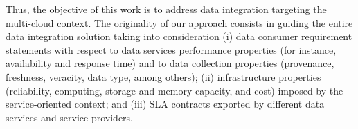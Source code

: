 %
Thus, the objective of this work is to address data integration targeting the multi-cloud context. 
%
The originality of our approach consists in guiding the entire data integration solution taking into consideration (i) data consumer requirement statements with respect to data services performance properties (for instance, availability and response time) and to data collection properties (provenance, freshness, veracity, data type, among others); (ii) infrastructure properties (reliability, computing, storage and memory capacity, and cost) imposed by the service-oriented context; and (iii) SLA contracts exported by different data services and service providers.
%
%
%

%


